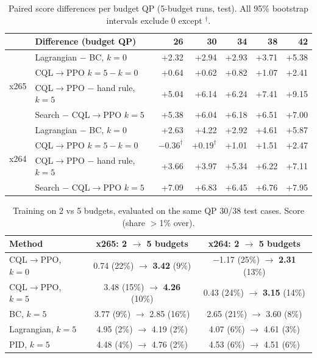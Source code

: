 \documentclass[conference,10pt]{IEEEtran}
\newcommand{\cqlppo}{CQL$\to$PPO}
\begin{document}
\begin{table}[t]
\centering\scriptsize
\caption{Paired score differences per budget QP (5-budget runs, test). All 95\% bootstrap intervals exclude 0 except $^\dagger$.}
\label{tab:budget}
\setlength{\tabcolsep}{3pt}
\begin{tabular}{@{}llrrrrr@{}}
\toprule
& Difference (budget QP) & 26 & 30 & 34 & 38 & 42\\
\midrule
\multirow{4}{*}{x265} & Lagrangian $-$ BC, $k{=}0$ & +2.32 & +2.94 & +2.93 & +3.71 & +5.38\\
& \cqlppo{} $k{=}5-k{=}0$ & +0.64 & +0.62 & +0.82 & +1.07 & +2.41\\
& \cqlppo{} $-$ hand rule, $k{=}5$ & +5.04 & +6.14 & +6.24 & +7.41 & +9.15\\
& Search $-$ \cqlppo{} $k{=}5$ & +5.38 & +6.04 & +6.18 & +6.51 & +7.00\\
\midrule
\multirow{4}{*}{x264} & Lagrangian $-$ BC, $k{=}0$ & +2.63 & +4.22 & +2.92 & +4.61 & +5.87\\
& \cqlppo{} $k{=}5-k{=}0$ & $-0.36^\dagger$ & $+0.19^\dagger$ & +1.01 & +1.51 & +2.47\\
& \cqlppo{} $-$ hand rule, $k{=}5$ & +3.66 & +3.97 & +5.34 & +6.22 & +7.11\\
& Search $-$ \cqlppo{} $k{=}5$ & +7.09 & +6.83 & +6.45 & +6.76 & +7.95\\
\bottomrule
\end{tabular}
\end{table}

\begin{table}[t]
\centering\scriptsize
\caption{Training on 2 vs 5 budgets, evaluated on the same QP 30/38 test cases. Score (share $>$1\% over).}
\label{tab:train}
\setlength{\tabcolsep}{3pt}
\begin{tabular}{@{}lcc@{}}
\toprule
Method & x265: 2 $\to$ 5 budgets & x264: 2 $\to$ 5 budgets\\
\midrule
\cqlppo, $k{=}0$ & 0.74 (22\%) $\to$ \textbf{3.42} (9\%) & $-$1.17 (25\%) $\to$ \textbf{2.31} (13\%)\\
\cqlppo, $k{=}5$ & 3.48 (15\%) $\to$ \textbf{4.26} (10\%) & 0.43 (24\%) $\to$ \textbf{3.15} (14\%)\\
BC, $k{=}5$ & 3.77 (9\%) $\to$ 2.85 (16\%) & 2.65 (21\%) $\to$ 3.60 (8\%)\\
Lagrangian, $k{=}5$ & 4.95 (2\%) $\to$ 4.19 (2\%) & 4.07 (6\%) $\to$ 4.61 (3\%)\\
PID, $k{=}5$ & 4.48 (4\%) $\to$ 4.76 (2\%) & 4.53 (6\%) $\to$ 4.51 (6\%)\\
\bottomrule
\end{tabular}
\end{table}
\end{document}
